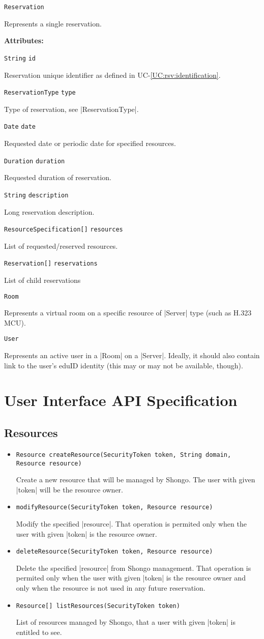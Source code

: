 \documentclass[a4paper]{report}
\newcommand{\APIcode}[1]{\lstinline[style=myinline]!#1!}
\newcommand{\APIcmd}[1]{%
\item \APIcode{#1}%

}
\newenvironment{APIattrs}{%

\textbf{Attributes:}\begin{compactitem}}{\end{compactitem}}
\newcommand{\APIattr}[2]{\item{\APIcode{#2} \APIcode{#1}}

}
\newenvironment{APIdef}{\begin{itemize}}{\end{itemize}}
\newcommand{\UCref}[1]{UC-\ref{UC:#1}}
\begin{document}
\begin{APIdef}
\APIcmd{Reservation}
Represents a single reservation.
\begin{APIattrs}
\APIattr{id}{String} Reservation unique identifier as defined in \UCref{rsv:identification}.
\APIattr{type}{ReservationType} Type of reservation, see |ReservationType|.
\APIattr{date}{Date} Requested date or periodic date for specified resources.
\APIattr{duration}{Duration} Requested duration of reservation.
\APIattr{description}{String} Long reservation description.
\APIattr{resources}{ResourceSpecification[]} List of requested/reserved resources.
\APIattr{reservations}{Reservation[]} List of child reservations
\end{APIattrs}


\APIcmd{Room}
Represents a virtual room on a specific resource of |Server| type (such as H.323 MCU).


\APIcmd{User}
Represents an active user in a |Room| on a |Server|. Ideally, it should also contain link to the user's eduID identity (this may or may not be available, though).

\end{APIdef}




\chapter{User Interface API Specification}

\section{Resources}

\begin{APIdef}

\APIcmd{Resource createResource(SecurityToken token, String domain, Resource resource)}
Create a new resource that will be managed by Shongo. The user with given |token| will be the resource owner.

\APIcmd{modifyResource(SecurityToken token, Resource resource)}
Modify the specified |resource|. That operation is permited only when the user with given |token| is the resource owner.

\APIcmd{deleteResource(SecurityToken token, Resource resource)}
Delete the specified |resource| from Shongo management. That operation is permited only when the user with given |token| is the resource owner and only when the resource is not used in any future reservation.

\APIcmd{Resource[] listResources(SecurityToken token)}
List of resources managed by Shongo, that a user with given |token| is entitled to see.

\end{APIdef}
\end{document}
